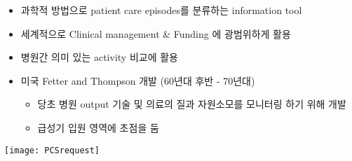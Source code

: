 \par
\medskip
\begin{itemize}\tightlist
\item 과학적 방법으로 patient care episodes를 분류하는 information tool
\item 세계적으로 Clinical management \& Funding 에 광범위하게 활용
\item 병원간 의미 있는 activity 비교에 활용
\item 미국 Fetter and Thompson 개발 (60년대 후반 - 70년대)
	\begin{itemize}\tightlist
	\item 당초 병원 output 기술 및 의료의 질과 자원소모를 모니터링 하기 위해 개발
	\item 급성기 입원 영역에 초점을 둠
	\end{itemize}
\end{itemize}
\prezi{\clearpage}
\begin{center}
\texttt{[image: PCSrequest]}
\end{center}
\prezi{\clearpage}
